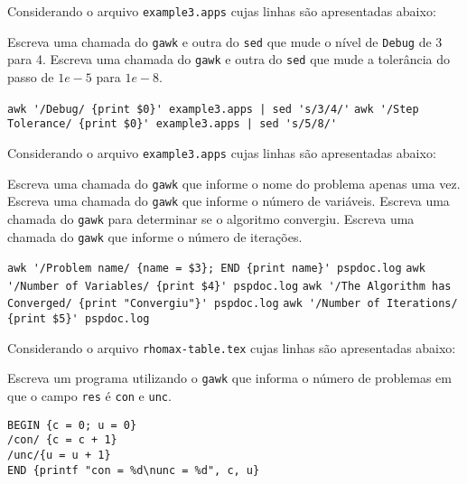 \begin{Exercise}[label={0004}, difficulty={0}, origin={gawk}]
  Considerando o arquivo \lstinline+example3.apps+ cujas linhas são
  apresentadas abaixo:
  
    \Question Escreva uma chamada do \lstinline+gawk+ e outra do \lstinline+sed+ que
      mude o nível de \lstinline+Debug+ de 3 para 4.
    \Question Escreva uma chamada do \lstinline+gawk+ e outra do \lstinline+sed+ que
      mude a tolerância do passo de $1e-5$ para $1e-8$.
\end{Exercise}
\begin{Answer}[ref={0004}]
    \Question \lstinline+awk '/Debug/ {print $0}' example3.apps | sed 's/3/4/'+
    \Question \lstinline+awk '/Step Tolerance/ {print $0}' example3.apps | sed 's/5/8/'+
\end{Answer}

\begin{Exercise}[label={0005}, difficulty={0}, origin={gawk}]
  Considerando o arquivo \lstinline+example3.apps+ cujas linhas são
  apresentadas abaixo:
  
    \Question Escreva uma chamada do \lstinline+gawk+ que informe o nome do
      problema apenas uma vez.
    \Question Escreva uma chamada do \lstinline+gawk+ que informe o número de
      variáveis.
    \Question Escreva uma chamada do \lstinline+gawk+ para determinar se o algoritmo
      convergiu.
    \Question Escreva uma chamada do \lstinline+gawk+ que informe o número de
      iterações.
\end{Exercise}
\begin{Answer}[ref={0005}]
    \Question \lstinline+awk '/Problem name/ {name = $3}; END {print name}' pspdoc.log+
    \Question \lstinline+awk '/Number of Variables/ {print $4}' pspdoc.log+
    \Question \lstinline+awk '/The Algorithm has Converged/ {print "Convergiu"}' pspdoc.log+
    \Question \lstinline+awk '/Number of Iterations/ {print $5}' pspdoc.log+
\end{Answer}

\begin{Exercise}[label={0006}, difficulty={1}, origin={gawk}]
  Considerando o arquivo \lstinline+rhomax-table.tex+ cujas linhas são
  apresentadas abaixo:
  
  Escreva um programa utilizando o \lstinline+gawk+ que informa o número de
  problemas em que o campo \lstinline+res+ é \lstinline+con+ e \lstinline+unc+.
\end{Exercise}
\begin{Answer}[ref={0006}]
  \begin{lstlisting}
BEGIN {c = 0; u = 0}
/con/ {c = c + 1}
/unc/{u = u + 1}
END {printf "con = %d\nunc = %d", c, u}
  \end{lstlisting}
\end{Answer}

